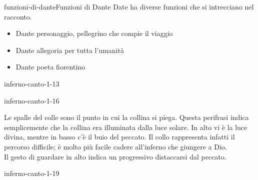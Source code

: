 \documentclass[preview]{standalone}
\begin{document}
\begin{snippetnote}{funzioni-di-dante}{Funzioni di Dante}
    Date ha diverse funzioni che si intrecciano nel racconto.
    \begin{itemize}
        \item Dante personaggio, pellegrino che compie il viaggio
        \item Dante allegoria per tutta l'umanità
        \item Dante poeta fiorentino
    \end{itemize}
\end{snippetnote}

\begin{snippet}{inferno-canto-1-13}

\end{snippet}

\begin{snippet}{inferno-canto-1-16}

    Le spalle del colle sono il punto in cui la collina si piega.
    Questa perifrasi indica semplicemente che la collina era illuminata dalla luce solare.
    In alto vi è la luce divina, mentre in basso c'è il buio del peccato.
    Il collo rappresenta infatti il percorso difficile; è molto più facile
    cadere all'inferno che giungere a Dio. \\
    Il gesto di guardare in alto indica un progressivo distaccarsi dal peccato.
\end{snippet}

\begin{snippet}{inferno-canto-1-19}

\end{snippet}
\end{document}
